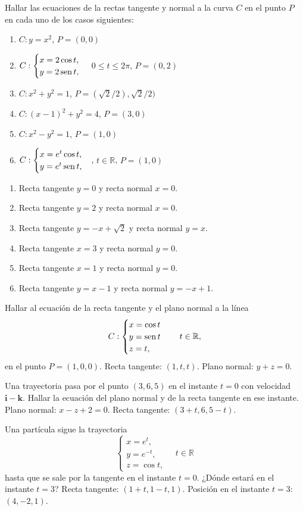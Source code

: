 {Hallar las ecuaciones de la rectas tangente y normal a la curva $C$ en el punto $P$ en cada uno de los casos siguientes:
\begin{enumerate}
\item $C: y=x^2$, $P=(0,0)$
\item $C: \begin{cases}
x=2\cos t,\\
y=2\operatorname{sen} t,
\end{cases}
$ $0\leq t\leq 2\pi$, $P=(0,2)$
\item $C:x^2+y^2=1$, $P=(\sqrt{2}/2),\sqrt{2}/2)$
\item $C:(x-1)^2+y^2=4$, $P=(3,0)$
\item $C:x^2-y^2=1$, $P=(1,0)$
\item $C:\begin{cases}
x=e^t\cos t,\\
y=e^t\operatorname{sen} t,
\end{cases}
$, $t\in \mathbb{R}$, $P=(1,0)$
\end{enumerate}
}
{
\begin{enumerate}
\item Recta tangente $y=0$ y recta normal $x=0$.
\item Recta tangente $y=2$ y recta normal $x=0$.
\item Recta tangente $y=-x+\sqrt{2}$ y recta normal $y=x$.
\item Recta tangente $x=3$ y recta normal $y=0$.
\item Recta tangente $x=1$ y recta normal $y=0$.
\item Recta tangente $y=x-1$ y recta normal $y=-x+1$.
\end{enumerate}
}
{
}


{Hallar al ecuación de la recta tangente y el plano normal a la línea
\[
C:
\begin{cases}
x=\cos t \\
y=\operatorname{sen} t\\
z= t,
\end{cases}
\quad t\in \mathbb{R},
\]
en el punto $P=(1,0,0)$.
}
{Recta tangente: $(1,t,t)$. Plano normal: $y+z=0$.
}
{
}


{Una trayectoria pasa por el punto $(3,6,5)$ en el instante $t=0$ con velocidad $\mathbf{i}-\mathbf{k}$.
Hallar la ecuación del plano normal y de la recta tangente en ese instante.
}
{Plano normal: $x-z+2=0$. Recta tangente: $(3+t,6,5-t)$.
}
{
}


{Una partícula sigue la trayectoria
\[
\begin{cases}
x=e^t,\\
y=e^{-t},\\
z=\cos t,
\end{cases}
\quad t\in \mathbb{R}
\]
hasta que se sale por la tangente en el instante $t=0$. ¿Dónde estará en el instante $t=3$?
}
{Recta tangente: $(1+t,1-t,1)$. Posición en el instante $t=3$: $(4,-2,1)$.
}
{
}
